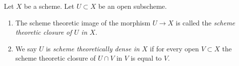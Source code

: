 \begin{definition}
\label{definition-scheme-theoretically-dense}
Let $X$ be a scheme. Let $U \subset X$ be an open subscheme.
\begin{enumerate}
\item The scheme theoretic image of the morphism $U \to X$
is called the {\it scheme theoretic closure of $U$ in $X$}.
\item We say $U$ is {\it scheme theoretically dense in $X$}
if for every open $V \subset X$ the scheme theoretic closure
of $U \cap V$ in $V$ is equal to $V$.
\end{enumerate}
\end{definition}